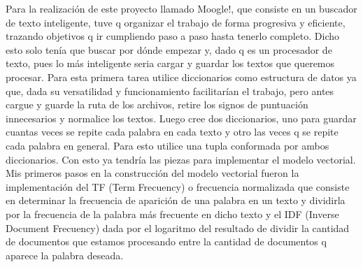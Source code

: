 \documentclass{beamer}
\begin{document}
\begin{frame}
Para la realización de este proyecto llamado Moogle!, que consiste en un buscador 
de texto inteligente, tuve q organizar el trabajo de forma progresiva y eficiente, 
trazando objetivos q ir cumpliendo paso a paso hasta tenerlo completo. Dicho esto 
solo tenía que buscar por dónde empezar y, dado q es un procesador de texto, pues 
lo más inteligente seria cargar y guardar los textos que queremos procesar.
Para esta primera tarea utilice diccionarios como estructura de datos ya que, dada su 
versatilidad y funcionamiento facilitarían el trabajo, pero antes cargue y guarde la 
ruta de los archivos, retire los signos de puntuación innecesarios y normalice los 
textos.
Luego cree dos diccionarios, uno para guardar cuantas veces se repite cada palabra 
en cada texto y otro las veces q se repite cada palabra en general. Para esto utilice 
una tupla conformada por ambos diccionarios.
Con esto ya tendría las piezas para implementar el modelo vectorial.
Mis primeros pasos en la construcción del modelo vectorial fueron la implementación 
del TF (Term Frecuency) o frecuencia normalizada que consiste en determinar la 
frecuencia de aparición de una palabra en un texto y dividirla por la frecuencia de la 
palabra más frecuente en dicho texto y el IDF (Inverse Document Frecuency) dada por 
el logaritmo del resultado de dividir la cantidad de documentos que estamos 
procesando entre la cantidad de documentos q aparece la palabra deseada.

\end{frame}
\end{document}
